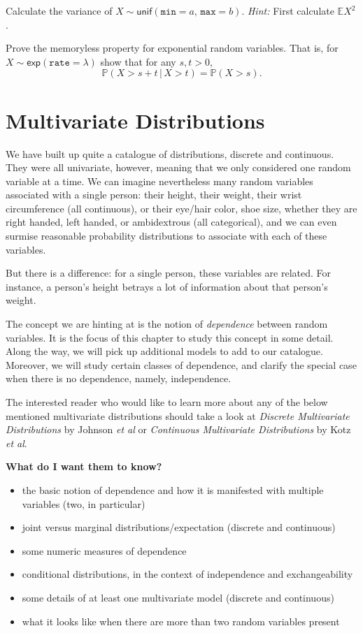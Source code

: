 \documentclass[captions=tableheading]{scrbook}
\begin{document}
\begin{xca}
Calculate the variance of \(X\sim\mathsf{unif}(\mathtt{min}=a,\,\mathtt{max}=b)\). \emph{Hint:} First calculate \(\mathbb{E} X^{2}\).
\end{xca}

\begin{xca}
Prove the memoryless property for exponential random variables. That is, for \(X\sim\mathsf{exp}(\mathtt{rate}=\lambda)\) show that for any \(s,t>0\),
\[
\mathbb{P}(X>s+t\,|\, X>t)=\mathbb{P}(X>s).
\]
\end{xca}
\chapter{Multivariate Distributions}
\label{sec-7}
\label{cha-Multivariable-Distributions}



\noindent 
We have built up quite a catalogue of distributions, discrete and continuous. They were all univariate, however, meaning that we only considered one random variable at a time. We can imagine nevertheless many random variables associated with a single person: their height, their weight, their wrist circumference (all continuous), or their eye/hair color, shoe size, whether they are right handed, left handed, or ambidextrous (all categorical), and we can even surmise reasonable probability distributions to associate with each of these variables.

But there is a difference: for a single person, these variables are related. For instance, a person's height betrays a lot of information about that person's weight.

The concept we are hinting at is the notion of \emph{dependence} between random variables. It is the focus of this chapter to study this concept in some detail. Along the way, we will pick up additional models to add to our catalogue. Moreover, we will study certain classes of dependence, and clarify the special case when there is no dependence, namely, independence.

The interested reader who would like to learn more about any of the below mentioned multivariate distributions should take a look at \emph{Discrete Multivariate Distributions} by Johnson \emph{et al}\cite{Johnson1997} or \emph{Continuous Multivariate Distributions} \cite{Kotz2000} by Kotz \emph{et al}.

\textbf{What do I want them to know?}
\begin{itemize}
\item the basic notion of dependence and how it is manifested with multiple variables (two, in particular)
\item joint versus marginal distributions/expectation (discrete and continuous)
\item some numeric measures of dependence
\item conditional distributions, in the context of independence and exchangeability
\item some details of at least one multivariate model (discrete and continuous)
\item what it looks like when there are more than two random variables present
\end{itemize}
\end{document}
